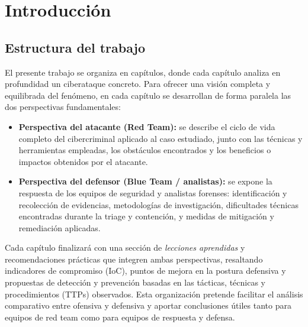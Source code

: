 \chapter{Introducción}

\section{Estructura del trabajo}
El presente trabajo se organiza en capítulos, donde cada capítulo analiza en 
profundidad un ciberataque concreto. Para ofrecer una visión completa y 
equilibrada del fenómeno, en cada capítulo se desarrollan de forma paralela 
las dos perspectivas fundamentales:

\begin{itemize}
    \item \textbf{Perspectiva del atacante (Red Team):} se describe el ciclo de 
    vida completo del cibercriminal aplicado al caso estudiado, junto con las 
    técnicas y herramientas empleadas, los obstáculos encontrados y los 
    beneficios o impactos obtenidos por el atacante.
    \item \textbf{Perspectiva del defensor (Blue Team / analistas):} se expone 
    la respuesta de los equipos de seguridad y analistas forenses: 
    identificación y recolección de evidencias, metodologías de investigación, 
    dificultades técnicas encontradas durante la triage y contención, y medidas 
    de mitigación y remediación aplicadas.
\end{itemize}

Cada capítulo finalizará con una sección de \emph{lecciones aprendidas} y 
recomendaciones prácticas que integren ambas perspectivas, resaltando 
indicadores de compromiso (IoC), puntos de mejora en la postura defensiva y 
propuestas de detección y prevención basadas en las tácticas, técnicas y 
procedimientos (TTPs) observados. Esta organización pretende facilitar el 
análisis comparativo entre ofensiva y defensiva y aportar conclusiones útiles 
tanto para equipos de red team como para equipos de respuesta y defensa.
